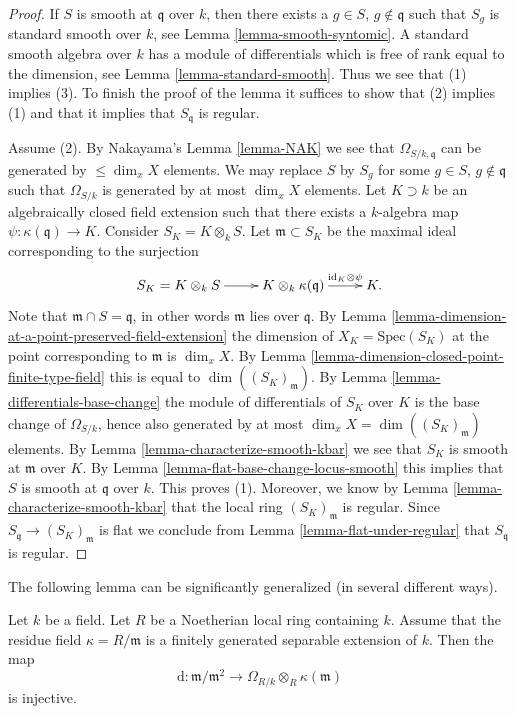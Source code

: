 \begin{proof}
If $S$ is smooth at $\mathfrak q$ over $k$, then there exists
a $g \in S$, $g \not \in \mathfrak q$ such that $S_g$ is
standard smooth over $k$, see Lemma \ref{lemma-smooth-syntomic}.
A standard smooth algebra over $k$ has a module of differentials
which is free of rank equal to the dimension, see
Lemma \ref{lemma-standard-smooth}. Thus we see that
(1) implies (3). To finish the proof of the lemma it
suffices to show that (2) implies (1) and that it implies
that $S_{\mathfrak q}$ is regular.

\medskip\noindent
Assume (2). By Nakayama's Lemma \ref{lemma-NAK} we see that
$\Omega_{S/k, \mathfrak q}$ can be generated by $\leq \dim_x X$ elements.
We may replace $S$ by $S_g$ for some $g \in S$, $g \not \in \mathfrak q$
such that $\Omega_{S/k}$ is generated by at most
$\dim_x X$ elements.
Let $K \supset k$ be an algebraically closed field extension
such that there exists a $k$-algebra map $\psi : \kappa(\mathfrak q) \to K$.
Consider $S_K = K \otimes_k S$. Let $\mathfrak m \subset S_K$
be the maximal ideal corresponding to the surjection
$$
\xymatrix{
S_K = K \otimes_k S \ar[r] &
K \otimes_k \kappa(\mathfrak q)
\ar[r]^-{\text{id}_K \otimes \psi} &
K.
}
$$
Note that $\mathfrak m \cap S = \mathfrak q$, in other words
$\mathfrak m$ lies over $\mathfrak q$.
By Lemma \ref{lemma-dimension-at-a-point-preserved-field-extension}
the dimension of $X_K = \text{Spec}(S_K)$ at the point corresponding
to $\mathfrak m$ is $\dim_x X$. By
Lemma \ref{lemma-dimension-closed-point-finite-type-field}
this is equal to $\dim((S_K)_{\mathfrak m})$.
By Lemma \ref{lemma-differentials-base-change}
the module of differentials of $S_K$ over $K$ is
the base change of $\Omega_{S/k}$, hence also
generated by at most $\dim_x X = \dim((S_K)_{\mathfrak m})$
elements. By Lemma \ref{lemma-characterize-smooth-kbar}
we see that $S_K$ is smooth at $\mathfrak m$ over $K$.
By Lemma \ref{lemma-flat-base-change-locus-smooth} this
implies that $S$ is smooth at $\mathfrak q$ over $k$.
This proves (1). Moreover, we know by
Lemma \ref{lemma-characterize-smooth-kbar}
that the local ring $(S_K)_{\mathfrak m}$ is regular.
Since $S_{\mathfrak q} \to (S_K)_{\mathfrak m}$ is flat we
conclude from Lemma \ref{lemma-flat-under-regular}
that $S_{\mathfrak q}$ is regular.
\end{proof}

\noindent
The following lemma can be significantly generalized
(in several different ways).

\begin{lemma}
\label{lemma-computation-differential}
Let $k$ be a field.
Let $R$ be a Noetherian local ring containing $k$.
Assume that the residue field $\kappa = R/\mathfrak m$
is a finitely generated separable extension of $k$.
Then the map
$$
\text{d} :
\mathfrak m/\mathfrak m^2
\longrightarrow
\Omega_{R/k} \otimes_R \kappa(\mathfrak m)
$$
is injective.
\end{lemma}

